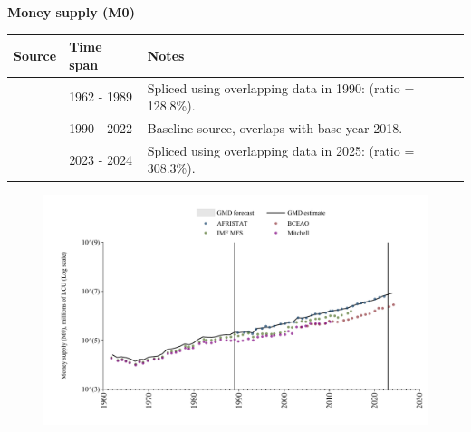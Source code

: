 \documentclass[12pt,a4paper,landscape]{article}
\begin{document}
\begin{adjustbox}{max totalsize={\paperwidth}{\paperheight},center}
\begin{minipage}[t][\textheight][t]{\textwidth}
\vspace*{0.5cm}
{}
\begin{center}
{\Large\bfseries Money supply (M0)}
\end{center}
\vspace{0.5cm}
\begin{table}[H]
\centering
\small
\begin{tabular}{|l|l|l|}
\hline
\textbf{Source} & \textbf{Time span} & \textbf{Notes} \\
\hline
\rowcolor{white}\cite{IMF_MFS}& 1962 - 1989 &Spliced using overlapping data in 1990: (ratio = 128.8\%). \\
\rowcolor{lightgray}\cite{AFRISTAT}& 1990 - 2022 &Baseline source, overlaps with base year 2018. \\
\rowcolor{white}\cite{BCEAO}& 2023 - 2024 &Spliced using overlapping data in 2025: (ratio = 308.3\%). \\
\hline
\end{tabular}
\end{table}
\begin{figure}[H]
\centering
\includegraphics[width=\textwidth,height=0.6\textheight,keepaspectratio]{graphs/SEN_M0.pdf}
\end{figure}
\end{minipage}
\end{adjustbox}
\end{document}
